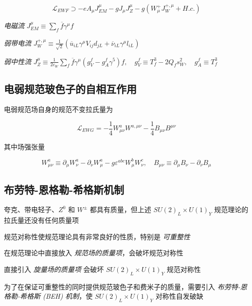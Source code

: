 \begin{equation}
    \mathcal{L}_{EWF} \supset -e A_\mu J_{EM}^\mu - g J_\mu J_Z^\mu - g (W_\mu^ + J_W^{+, \mu} + H.c.)
\end{equation}

\emph{电磁流} $J_{EM}^\mu \equiv \sum_f \overline{f} \gamma^\mu f$

\emph{弱带电流} $J_{W}^{+, \mu} \equiv \frac{1}{\sqrt{2}}(\overline{u}_{iL} \gamma^\mu V_{ij} d_{jL} + \overline{\nu}_{iL} \gamma^\mu l_{iL})$

\emph{弱中性流} $J_{Z}^\mu \equiv \frac{1}{2 c_W} \sum_f \overline{f} \gamma^\mu (g_V^f-g_A^f \gamma^5)f, \quad g_V^f \equiv T_f^3 - 2 Q_f s_W^2, \quad g_A^f \equiv T_f^3$

\subsection{电弱规范玻色子的自相互作用}

电弱规范场自身的规范不变拉氏量为

\begin{equation}
    \mathcal{L}_{EWG} = -\frac{1}{4} W_{\mu\nu}^a W^{a, \mu\nu} - \frac{1}{4} B_{\mu\nu} B^{\mu\nu}
\end{equation}

其中场强张量

\begin{equation}
    W_{\mu\nu}^a \equiv \partial_\mu W_\nu^a - \partial_\nu W_\mu^a - g \varepsilon^{abc} W_\mu^b W_\nu^c, \quad B_{\mu\nu} \equiv \partial_\mu B_\nu - \partial_\nu B_\mu
\end{equation}

\subsection{布劳特-恩格勒-希格斯机制}

夸克、带电轻子、$Z^0$ 和 $W^\pm$ 都具有质量，但上述 $SU(2)_L \times U(1)_Y$ 规范理论的拉氏量还没有任何质量项

规范对称性使规范理论具有非常良好的性质，特别是 \emph{可重整性}

在规范理论中直接放入 \emph{规范场的质量项}，会破坏规范对称性

直接引入 \emph{旋量场的质量项} 会破坏 $SU(2)_L \times U(1)_Y$ 规范对称性

为了在保证可重整性的同时提供规范玻色子和费米子的质量，需要引入 \emph{布劳特-恩格勒-希格斯 (BEH) 机制}，使 $SU(2)_L \times U(1)_Y$ 对称性自发破缺

